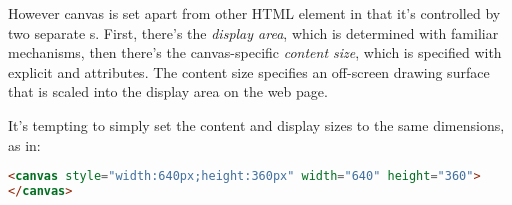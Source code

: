However canvas is set apart from other HTML element in that it's controlled by two separate s.  First, there's the \emph{display area}, which is determined with familiar  mechanisms, then there's the canvas-specific \emph{content size}, which is specified with explicit \texttt{} and \texttt{} attributes.  The content size specifies an off-screen drawing surface that is scaled into the display area on the web page.

It's tempting to simply set the content and display sizes to the same dimensions, as in:

\begin{lstlisting}[language=HTML]
<canvas style="width:640px;height:360px" width="640" height="360">
</canvas>
\end{lstlisting}

